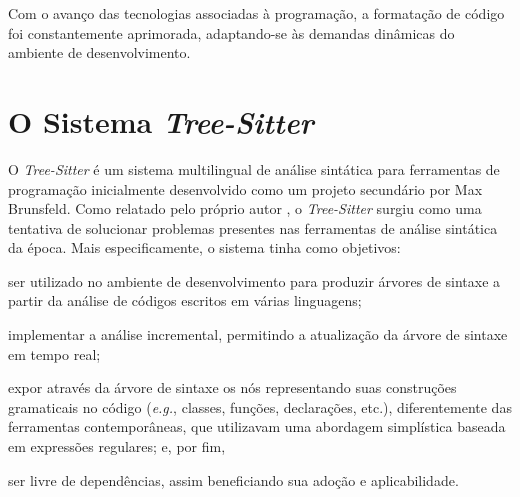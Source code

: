\documentclass[11pt, a4paper, english, openright, twoside, brazil]{abntex2}
\begin{document}
  Com o avanço das tecnologias associadas à programação, a formatação de código
  foi constantemente aprimorada, adaptando-se às demandas dinâmicas do ambiente
  de desenvolvimento.


  \chapter{O Sistema \textit{Tree-Sitter}}

  O \textit{Tree-Sitter} é um sistema multilingual de análise sintática para
  ferramentas de programação inicialmente desenvolvido como um projeto
  secundário por Max Brunsfeld. Como relatado pelo próprio autor
  \cite{github-2017-tree}, o \textit{Tree-Sitter} surgiu como uma tentativa de
  solucionar problemas presentes nas ferramentas de análise sintática da época.
  Mais especificamente, o sistema tinha como objetivos:
  \begin{inparaenum}
    \item ser utilizado no ambiente de desenvolvimento para produzir árvores de
          sintaxe a partir da análise de códigos escritos em várias linguagens;
    \item implementar a análise incremental, permitindo a atualização da árvore
          de sintaxe em tempo real;
    \item expor através da árvore de sintaxe os nós representando suas
          construções gramaticais no código (\textit{e.g.}, classes, funções,
          declarações, etc.), diferentemente das ferramentas contemporâneas,
          que utilizavam uma abordagem simplística baseada em expressões
          regulares; e, por fim,
    \item ser livre de dependências, assim beneficiando sua adoção e
          aplicabilidade.
  \end{inparaenum}
\end{document}
